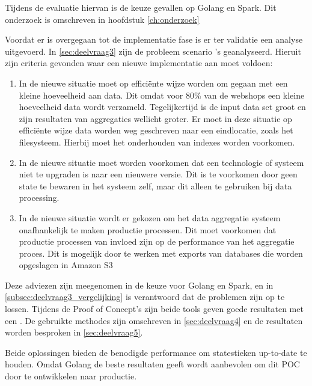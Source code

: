 \clearpage

Tijdens de evaluatie hiervan is de keuze gevallen op Golang en Spark. Dit onderzoek is omschreven in hoofdstuk \ref{ch:onderzoek}

Voordat er is overgegaan tot de implementatie fase is er ter validatie een analyse uitgevoerd. In \ref{sec:deelvraag3} zijn de probleem scenario 's geanalyseerd. Hieruit zijn criteria gevonden waar een nieuwe implementatie aan moet voldoen:

\begin{enumerate}[label=(\alph*)]
    \item In de nieuwe situatie moet op efficiënte wijze worden om gegaan met een kleine hoeveelheid aan data. Dit omdat voor 80\% van de webshops een kleine hoeveelheid data wordt verzameld. Tegelijkertijd is de input data set groot en zijn resultaten van aggregaties wellicht groter. Er moet in deze situatie op efficiënte wijze data worden weg geschreven naar een eindlocatie,  zoals het filesysteem. Hierbij moet het onderhouden van indexes worden voorkomen.
    
    \item In de nieuwe situatie moet worden voorkomen dat een technologie of systeem niet te upgraden is naar een nieuwere versie. Dit is te voorkomen door geen state te bewaren in het systeem zelf, maar dit alleen te gebruiken bij data processing.
    
    \item In de nieuwe situatie wordt er gekozen om het data aggregatie systeem onafhankelijk te maken productie processen. Dit moet voorkomen dat productie processen van invloed zijn op de performance van het aggregatie proces. Dit is mogelijk door te werken met exports van databases die worden opgeslagen in Amazon S3
\end{enumerate}


Deze adviezen zijn meegenomen in de keuze voor Golang en Spark, en in \ref{subsec:deelvraag3_vergelijking} is verantwoord dat de problemen zijn op te lossen. Tijdens de Proof of Concept's zijn beide tools geven goede resultaten met een . De gebruikte methodes zijn omschreven in \ref{sec:deelvraag4} en de resultaten worden besproken in \ref{sec:deelvraag5}.

Beide oplossingen bieden de benodigde performance om statestieken up-to-date te houden. Omdat Golang de beste resultaten geeft wordt aanbevolen om dit POC door te ontwikkelen naar productie.